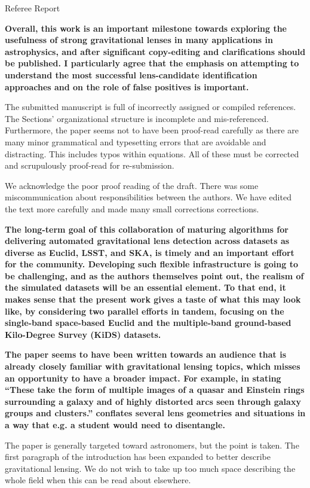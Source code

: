 \documentclass[11pt,a4paper]{article}
\author{R.B. Metcalf}
\begin{document}
Referee Report

{\bf 
Overall, this work is an important milestone towards exploring the usefulness of strong gravitational lenses in many applications in astrophysics, and after significant copy-editing and clarifications should be published.  I particularly agree that the emphasis on attempting to understand the most successful lens-candidate identification approaches and on the role of false positives is important. 

The submitted manuscript is full of incorrectly assigned or compiled references.  The Sections’ organizational structure is incomplete and mis-referenced. Furthermore, the paper seems not to have been proof-read carefully as there are many minor grammatical and typesetting errors that are avoidable and distracting.  This includes typos within equations.  All of these must be corrected and scrupulously proof-read for re-submission.  }

We acknowledge the poor proof reading of the draft.  There was some miscommunication about responsibilities between the authors.  We have edited the text more carefully and made many small corrections corrections. 

{\bf
The long-term goal of this collaboration of maturing algorithms for delivering automated gravitational lens detection across datasets as diverse as Euclid, LSST, and SKA, is timely and an important effort for the community.  Developing such flexible infrastructure is going to be challenging, and as the authors themselves point out, the realism of the simulated datasets will be an essential element. To that end, it makes sense that the present work gives a taste of what this may look like, by considering two parallel efforts in tandem, focusing on the single-band space-based Euclid and the multiple-band ground-based Kilo-Degree Survey (KiDS) datasets. 
}

{\bf
The paper seems to have been written towards an audience that is already closely familiar with gravitational lensing topics, which misses an opportunity to have a broader impact. For example, in stating “These take the form of multiple images of a quasar and Einstein rings surrounding a galaxy and of highly distorted arcs seen through galaxy groups and clusters.” conflates several lens geometries and situations in a way that e.g. a student would need to disentangle. 
}

The paper is generally targeted toward astronomers, but the point is taken.  The first paragraph of the introduction has been expanded to better describe gravitational lensing.  We do not wish to take up too much space describing the whole field when this can be read about elsewhere.
\end{document}
